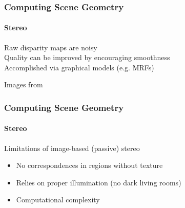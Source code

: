 \documentclass[xetex,professionalfont]{beamer}
\newcommand{\eg}{\mbox{e.g.}\xspace} %
\begin{document}

\begin{frame}
\frametitle{Computing Scene Geometry}
\framesubtitle{Stereo}

Raw disparity maps are noisy\\\medskip
Quality can be improved by encouraging smoothness\\\medskip
Accomplished via graphical models (\eg MRFs) %

\bigskip
\begin{center}
    {\centering Images from \cite{prince12}}
\end{center}

\end{frame}


\begin{frame}
\frametitle{Computing Scene Geometry}
\framesubtitle{Stereo}

Limitations of image-based (passive) stereo
\begin{itemize}
    \item No correspondences in regions without texture %
    \item Relies on proper illumination (no dark living rooms) %
    \item Computational complexity %
\end{itemize}

\end{frame}

\end{document}
